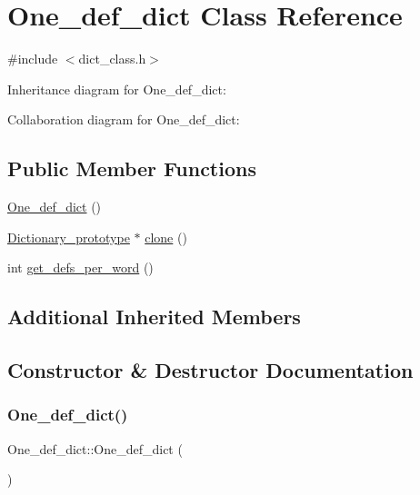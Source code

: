 \hypertarget{class_one__def__dict}{}\section{One\+\_\+def\+\_\+dict Class Reference}
\label{class_one__def__dict}


{\ttfamily \#include $<$dict\+\_\+class.\+h$>$}



Inheritance diagram for One\+\_\+def\+\_\+dict\+:


Collaboration diagram for One\+\_\+def\+\_\+dict\+:
\subsection*{Public Member Functions}
\begin{DoxyCompactItemize}
\item 
\mbox{\hyperlink{class_one__def__dict_a9c76f3f1021c96ffd857f74890cf7428}{One\+\_\+def\+\_\+dict}} ()
\item 
\mbox{\hyperlink{class_dictionary__prototype}{Dictionary\+\_\+prototype}} $\ast$ \mbox{\hyperlink{class_one__def__dict_a1824ad06343b0c10571c9c34b995d6ee}{clone}} ()
\item 
int \mbox{\hyperlink{class_one__def__dict_ab3c5cd3f8f8ae83ebb39d7c8e11627e5}{get\+\_\+defs\+\_\+per\+\_\+word}} ()
\end{DoxyCompactItemize}
\subsection*{Additional Inherited Members}


\subsection{Constructor \& Destructor Documentation}
\mbox{\label{class_one__def__dict_a9c76f3f1021c96ffd857f74890cf7428}} 
\subsubsection{\texorpdfstring{One\_def\_dict()}{One\_def\_dict()}}
{\footnotesize\ttfamily One\+\_\+def\+\_\+dict\+::\+One\+\_\+def\+\_\+dict (\begin{DoxyParamCaption}{ }\end{DoxyParamCaption})\hspace{0.3cm}{\ttfamily [inline]}}



